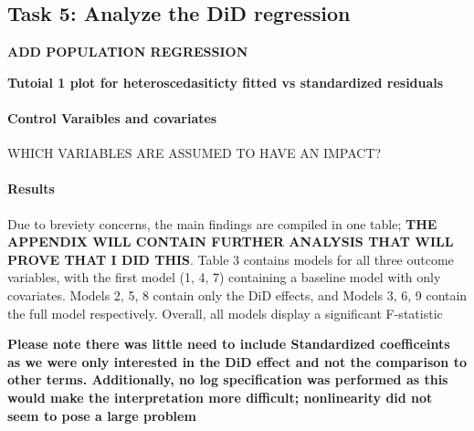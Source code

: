 \documentclass[a4paper]{article}
\begin{document}
\subsection{Task 5: Analyze the DiD regression}
\textbf{ADD POPULATION REGRESSION}

\textbf{Tutoial 1 plot for heteroscedasiticty fitted vs standardized residuals}

\paragraph{Control Varaibles and covariates} WHICH VARIABLES ARE ASSUMED TO HAVE AN IMPACT? 

\paragraph{Results} Due to breviety concerns, the main findings are compiled in one table; \textbf{THE APPENDIX WILL CONTAIN FURTHER ANALYSIS THAT WILL PROVE THAT I DID THIS}.
Table 3 contains models for all three outcome variables, with the first model (1, 4, 7) containing a baseline model with only covariates. Models 2, 5, 8 contain only the DiD effects, and Models 3, 6, 9 contain the full model respectively. 
Overall, all models display a significant F-statistic

\textbf{Please note there was little need to include Standardized coefficeints as we were only interested in the DiD effect and not the comparison to other terms. Additionally, no log specification was performed as this would make the interpretation more difficult; nonlinearity did not seem to pose a large problem}
\end{document}
